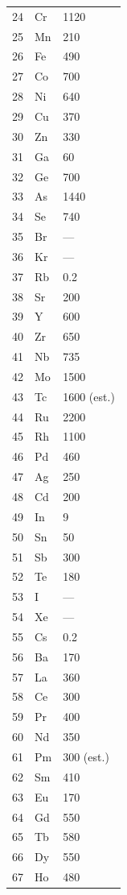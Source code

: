 \documentclass[12pt,a4paper]{article}
\begin{document}
\begin{longtable}{p{0.6cm}p{1.2cm}p{2.5cm}}
		24 & Cr & 1120 \\
		25 & Mn & 210 \\
		26 & Fe & 490 \\
		27 & Co & 700 \\
		28 & Ni & 640 \\
		29 & Cu & 370 \\
		30 & Zn & 330 \\
		31 & Ga & 60 \\
		32 & Ge & 700 \\
		33 & As & 1440 \\
		34 & Se & 740 \\
		35 & Br & — \\
		36 & Kr & — \\
		37 & Rb & 0.2 \\
		38 & Sr & 200 \\
		39 & Y  & 600 \\
		40 & Zr & 650 \\
		41 & Nb & 735 \\
		42 & Mo & 1500 \\
		43 & Tc & 1600 (est.) \\
		44 & Ru & 2200 \\
		45 & Rh & 1100 \\
		46 & Pd & 460 \\
		47 & Ag & 250 \\
		48 & Cd & 200 \\
		49 & In & 9 \\
		50 & Sn & 50 \\
		51 & Sb & 300 \\
		52 & Te & 180 \\
		53 & I  & — \\
		54 & Xe & — \\
		55 & Cs & 0.2 \\
		56 & Ba & 170 \\
		57 & La & 360 \\
		58 & Ce & 300 \\
		59 & Pr & 400 \\
		60 & Nd & 350 \\
		61 & Pm & 300 (est.) \\
		62 & Sm & 410 \\
		63 & Eu & 170 \\
		64 & Gd & 550 \\
		65 & Tb & 580 \\
		66 & Dy & 550 \\
		67 & Ho & 480 \\

\end{longtable}
\end{document}
